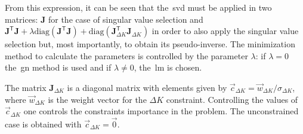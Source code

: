 From this expression, it can be seen that the~\gls{svd} must be applied in two matrices: $\mathbf{J}$ for the case of singular value selection and $\mathbf{J}^{\mathsf{T}}\mathbf{J} + \lambda \mathrm{diag}\left(\mathbf{J}^{\mathsf{T}}\mathbf{J}\right) + \mathrm{diag}\left(\mathbf{J}^{\mathsf{T}}_{\Delta K}\mathbf{J}_{\Delta K}\right)$ in order to also apply the singular value selection but, most importantly, to obtain its pseudo-inverse. The minimization method to calculate the parameters is controlled by the parameter $\lambda$: if $\lambda = 0$ the~\gls{gn} method is used and if $\lambda \neq 0$, the~\gls{lm} is chosen.

The matrix $\mathbf{J}_{\Delta K}$ is a diagonal matrix with elements given by $\vec{c}_{\Delta K} = \vec{w}_{\Delta K}/\sigma_{\Delta K}$, where $\vec{w}_{\Delta K}$ is the weight vector for the ${\Delta K}$ constraint. Controlling the values of $\vec{c}_{\Delta K}$ one controls the constraints importance in the problem. The unconstrained case is obtained with $\vec{c}_{\Delta K} = \vec{0}$.

